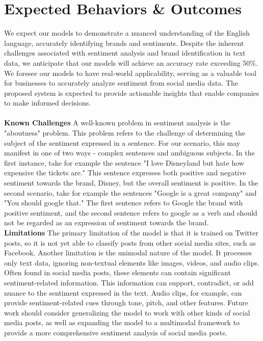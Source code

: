 \documentclass{article}
\begin{document}
\section*{Expected Behaviors \& Outcomes}
We expect our models to demonstrate a nuanced understanding of the English
language, accurately identifying brands and sentiments. Despite the inherent
challenges associated with sentiment analysis and brand identification in text
data, we anticipate that our models will achieve an accuracy rate exceeding
50\%. We foresee our models to have real-world applicability, serving as a
valuable tool for businesses to accurately analyze sentiment from social media
data. The proposed system is expected to provide actionable insights that
enable companies to make informed decisions.\\
\\
\textbf{Known Challenges} A well-known problem in sentiment analysis is the "aboutness" problem. This problem refers to the challenge of determining the subject of the sentiment expressed in a sentence. For our scenario, this may manifest in one of two ways - complex sentences and ambiguous subjects. In the first instance, take for example the sentence "I love Disneyland but hate how expensive the tickets are." This sentence expresses both positive and negative sentiment towards the brand, Disney, but the overall sentiment is positive. In the second scenario, take for example the sentences "Google is a great company" and "You should google that." The first sentence refers to Google the brand with positive sentiment, and the second sentence refers to google as a verb and should not be regarded as an expression of sentiment towards the brand. \\

\textbf{Limitations} The primary limitation of the model is that it is trained on Twitter posts, so it is not yet able to classify posts from other social media sites, such as Facebook. Another limitation is the unimodal nature of the model. It processes only text data, ignoring non-textual elements like images, videos,
and audio clips. Often found in social media posts, these elements can contain
significant sentiment-related information. This information can support,
contradict, or add nuance to the sentiment expressed in the text. Audio clips,
for example, can provide sentiment-related cues through tone, pitch, and other
features. Future work should consider generalizing the model to work with other kinds of social media posts, as well as
expanding the model to a multimodal framework to provide a more comprehensive
sentiment analysis of social media posts.
\end{document}
